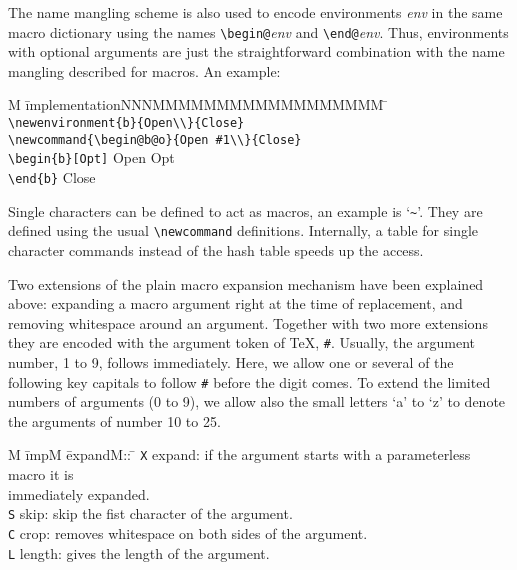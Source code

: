 \documentclass[11pt]{article}
\begin{document}
The name mangling scheme is also used to encode environments {\em
  env\/} in the same macro dictionary using the names
\verb+\begin@+{\em env\/} and \verb+\end@+{\em env}. Thus,
environments with optional arguments are just the straightforward
combination with the name mangling described for macros. An example:

\begin{tabbing}
  M \= implementationNNNMMMMMMMMMMMMMMMMMM \= \kill
  \> \verb+\newenvironment{b}{Open\\}{Close}+ \\
  \> \verb+\newcommand{\begin@b@o}{Open #1\\}{Close}+ \\
  \> \verb+\begin{b}[Opt]+        \> Open Opt\\
  \> \verb+\end{b}+               \> Close
\end{tabbing}

Single characters can be defined to act as macros, an example is
`\verb+~+'.  They are defined using the usual \verb+\newcommand+
definitions. Internally, a table for single character commands instead
of the hash table speeds up the access.

Two extensions of the plain macro expansion mechanism have been
explained above: expanding a macro argument right at the time of
replacement, and removing whitespace around an argument. Together
with two more extensions they are encoded with the argument token of
\TeX, {\tt \#}. Usually, the argument number, 1 to 9, follows
immediately. Here, we allow one or several of the following key
capitals to follow {\tt \#} before the digit comes. To extend the
limited numbers of arguments (0 to 9), we allow also the small letters
`a' to `z' to denote the arguments of number 10 to 25.

\begin{tabbing}
  M \= impM \= expandM:: \= \kill
  \> \verb+X+ \> expand: \> if the argument starts with a parameterless macro 
                            it is\\ \> \> \> immediately expanded.\\
  \> \verb+S+ \> skip:   \> skip the fist character of the argument.\\
  \> \verb+C+ \> crop:   \> removes whitespace on both sides of the 
                            argument.\\
  \> \verb+L+ \> length: \> gives the length of the argument.
\end{tabbing}
\end{document}
